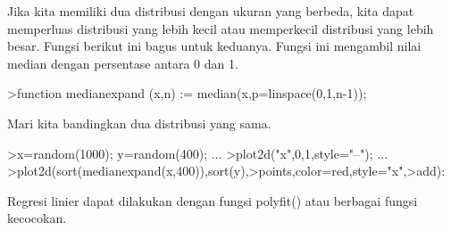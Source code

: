 \documentclass[a4paper,10pt]{article}
\begin{document}
\begin{eulernotebook}
\begin{eulercomment}
\begin{eulercomment}
\begin{eulercomment}
\begin{eulercomment}
\begin{eulercomment}
\begin{eulercomment}
\begin{eulercomment}
\begin{eulercomment}
\begin{eulercomment}
\begin{eulercomment}
\begin{eulercomment}
\begin{eulercomment}
\begin{eulercomment}
\begin{eulercomment}
\begin{eulercomment}
\begin{eulercomment}
\begin{eulercomment}
\begin{eulercomment}
\begin{eulercomment}
Jika kita memiliki dua distribusi dengan ukuran yang berbeda, kita
dapat memperluas distribusi yang lebih kecil atau memperkecil
distribusi yang lebih besar. Fungsi berikut ini bagus untuk keduanya.
Fungsi ini mengambil nilai median dengan persentase antara 0 dan 1.
\end{eulercomment}
\begin{eulerprompt}
>function medianexpand (x,n) := median(x,p=linspace(0,1,n-1));
\end{eulerprompt}
\begin{eulercomment}
Mari kita bandingkan dua distribusi yang sama.
\end{eulercomment}
\begin{eulerprompt}
>x=random(1000); y=random(400); ...
>plot2d("x",0,1,style="--"); ...
>plot2d(sort(medianexpand(x,400)),sort(y),>points,color=red,style="x",>add):
\end{eulerprompt}
\begin{eulercomment}
Regresi linier dapat dilakukan dengan fungsi polyfit() atau berbagai
fungsi kecocokan.


\end{eulercomment}
\end{eulercomment}
\end{eulercomment}
\end{eulercomment}
\end{eulercomment}
\end{eulercomment}
\end{eulercomment}
\end{eulercomment}
\end{eulercomment}
\end{eulercomment}
\end{eulercomment}
\end{eulercomment}
\end{eulercomment}
\end{eulercomment}
\end{eulercomment}
\end{eulercomment}
\end{eulercomment}
\end{eulercomment}
\end{eulercomment}
\end{eulernotebook}
\end{document}

